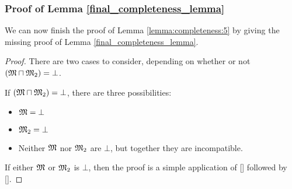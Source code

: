 \subsubsection{Proof of Lemma \ref{final_completeness_lemma}}
\label{prooflemma6}

We can now finish the proof of Lemma \ref{lemma:completeness:5} by
giving the missing proof of Lemma \ref{final_completeness_lemma}.

\begin{proof}
There are two cases to consider, depending on whether or not $(\frak{M}
\sqcap \frak{M}_2) = \bot$.


If $(\frak{M} \sqcap \frak{M}_2) = \bot$, there are three possibilities:
\begin{itemize}
\item
$\frak{M} = \bot$
\item
$\frak{M}_2 = \bot$
\item
Neither $\frak{M}$ nor $\frak{M}_2$ are $\bot$, but together they are incompatible. 
\end{itemize}
If either $\frak{M}$ or $\frak{M}_2$ is $\bot$, then the proof is a simple application of [] followed by [].


\end{proof}
